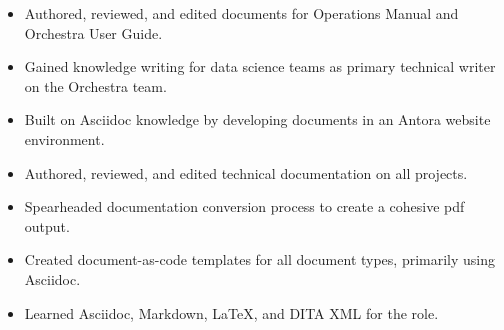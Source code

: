 \documentclass[10pt,a4paper]{altacv}
\begin{document}

\begin{fullwidth}
\makecvheader
\end{fullwidth}


\begin{itemize}
        \item Authored, reviewed, and edited documents for Operations Manual and Orchestra User Guide.
        \item Gained knowledge writing for data science teams as primary technical writer on the Orchestra team.
        \item Built on Asciidoc knowledge by developing documents in an Antora website environment.
\end{itemize}

\divider

\begin{itemize}
        \item Authored, reviewed, and edited technical documentation on all projects.
        \item Spearheaded documentation conversion process to create a cohesive pdf output.
        \item Created document-as-code templates for all  document types, primarily using Asciidoc.
        \item Learned Asciidoc, Markdown, LaTeX, and DITA XML for the role. 
\end{itemize}
\end{document}
